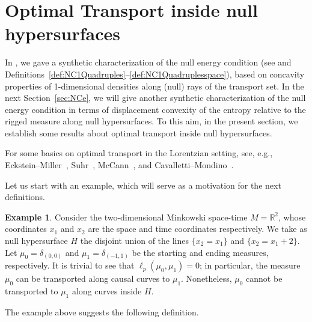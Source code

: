 \documentclass[12pt,a4paper]{amsart}
\theoremstyle{plain}
\theoremstyle{definition}
\newtheorem{example}[lemma]{Example}
\numberwithin{equation}{section}
\newcommand{\R}{\mathbb{R}}
\begin{document}
\section{Optimal Transport inside null hypersurfaces}\label{sec:OTinsideH}

In , we gave a synthetic characterization of the null energy condition (see  and Definitions~\ref{def:NC1Quadruples}--\ref{def:NC1Quadruplesspace}), based on concavity properties of 1-dimensional densities along (null) rays of the transport set. In the next Section~\ref{sec:NCe}, we will give another synthetic characterization of the null energy condition in terms of displacement convexity of the entropy relative to the rigged measure along null hypersurfaces.  To this aim, in the present section, we establish some results about optimal transport inside null hypersurfaces.
%

For some basics on optimal transport in the Lorentzian setting, see, e.g., Eckstein--Miller~\cite{EM17}, Suhr~\cite{Suhr}, McCann~\cite{McCann}, and Cavalletti--Mondino~\cite{CaMo:20}.


Let us start with an example, which will serve as a motivation for the next definitions.



\begin{example}
  Consider the two-dimensional Minkowski space-time $M=\R^2$, whose
  coordinates $x_1$ and $x_2$ are the space and time coordinates
  respectively.
  We take as null hypersurface $H$ the disjoint union of the lines
  $\{x_2=x_1\}$ and $\{x_2=x_1+2\}$.
  Let $\mu_0=\delta_{(0,0)}$ and
  $\mu_1=\delta_{(-1,1)}$ be the starting and ending measures,  respectively.
  It is trivial to see that $\ell_{p}(\mu_0,\mu_1)=0$; in particular, the
  measure $\mu_0$ can be transported along causal curves to $\mu_1$.
  Nonetheless, $\mu_0$ cannot be transported to $\mu_1$ along curves
  inside $H$.
\end{example}

The example above suggests the following definition.
\end{document}
